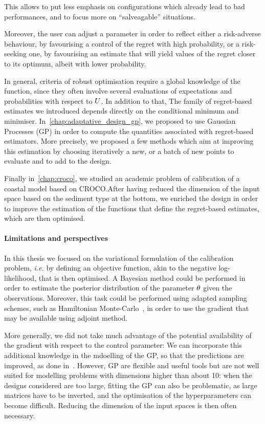 \documentclass[../../Main_ManuscritThese.tex]{subfiles}
\begin{document}
This allows to put less emphasis on configurations which already lead
to bad performances, and to focus more on ``salveagable'' situations.

Moreover, the user can adjust a parameter in order to reflect either a
risk-adverse behaviour, by favourising a control of the regret with
high probability, or a risk-seeking one, by favourising an estimate
that will yield values of the regret closer to its optimum, albeit
with lower probability.


In general, criteria of robust optimisation require a global knowledge
of the function, since they often involve several evaluations of
expectations and probabilities with respect to $U$. In addition to
that, The family of regret-based estimates we introduced depends
directly on the conditional minimum and
minimiser. In~\cref{chap:adaptative_design_gp}, we proposed to use
Gaussian Processes (GP) in order to compute the quantities associated with
regret-based estimators. More precisely, we proposed a few methods
which aim at improving this estimation by choosing iteratively a new,
or a batch of new points to evaluate and to add to the design.

Finally in~\cref{chap:croco}, we studied an academic problem of
calibration of a coastal model based on CROCO.\@ After having reduced
the dimension of the input space based on the sediment type at the
bottom, we enriched the design in order to improve the estimation of
the functions that define the regret-based estimates, which are then
optimised.

\paragraph{Limitations and perspectives}


In this thesis we focused on the variational formulation of the
calibration problem, \emph{i.e.} by defining an objective function,
akin to the negative log-likelihood, that is then optimised. A
Bayesian method could be performed in order to estimate the posterior
distribution of the parameter $\theta$ given the observations. Moreover,
this task could be performed using adapted sampling schemes, such as
Hamiltonian Monte-Carlo~\cite{betancourt_conceptual_2017}, in order to
use the gradient that may be available using adjoint method.

More generally, we did not take much advantage of the potential
availability of the gradient with respect to the control parameter: We
can incorporate this additional knowledge in the mdoelling of the GP,
so that the predictions are improved, as done
in~\cite{bouhlel_gradient-enhanced_2019,laurent_overview_2019}.
However, GP are flexible and useful tools but are not well suited for
modelling problems with dimensions higher than about 10: when the
designs considered are too large, fitting the GP can also be
problematic, as large matrices have to be inverted, and the
optimisation of the hyperparameters can become difficult. Reducing the
dimension of the input spaces is then often necessary.
\end{document}
